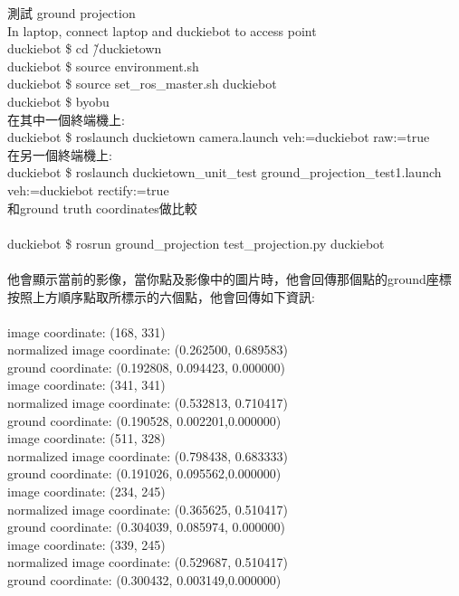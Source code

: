 \documentclass{article}
\begin{document}
測試 ground projection
\\In laptop, connect laptop and duckiebot to access point
\\duckiebot \$ cd \~/duckietown
\\duckiebot \$ source environment.sh
\\duckiebot \$ source set\_ros\_master.sh duckiebot
\\duckiebot \$ byobu
\\在其中一個終端機上:
\\duckiebot \$ roslaunch duckietown camera.launch veh:=duckiebot raw:=true
\\在另一個終端機上:
\\duckiebot \$ roslaunch duckietown\_unit\_test ground\_projection\_test1.launch veh:=duckiebot  rectify:=true
\\和ground truth coordinates做比較
\\
\\duckiebot \$ rosrun ground\_projection test\_projection.py duckiebot
\\
\\他會顯示當前的影像，當你點及影像中的圖片時，他會回傳那個點的ground座標
\\
按照上方順序點取所標示的六個點，他會回傳如下資訊:
\\
\\image coordinate: (168, 331)
\\normalized image coordinate: (0.262500, 0.689583)
\\ground coordinate: (0.192808, 0.094423, 0.000000)
\\image coordinate: (341, 341)
\\normalized image coordinate: (0.532813, 0.710417)
\\ground coordinate: (0.190528, 0.002201,0.000000)
\\image coordinate: (511, 328)
\\normalized image coordinate: (0.798438, 0.683333)
\\ground coordinate: (0.191026, 0.095562,0.000000)
\\image coordinate: (234, 245)
\\normalized image coordinate: (0.365625, 0.510417)
\\ground coordinate: (0.304039, 0.085974, 0.000000)
\\image coordinate: (339, 245)
\\normalized image coordinate: (0.529687, 0.510417)
\\ground coordinate: (0.300432, 0.003149,0.000000)
\end{document}
